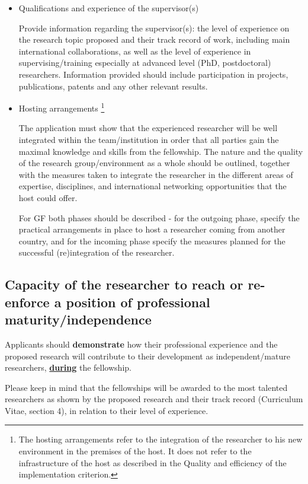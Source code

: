 \begin{itemize}
  \item Qualifications and experience of the supervisor(s)

Provide information regarding the supervisor(s): 
the level of experience on the research topic proposed and their track record of work, 
including main international collaborations, 
as well as the level of experience in supervising/training especially at advanced level (PhD, postdoctoral) researchers.
Information provided should include participation in projects, publications, patents and any other relevant results.

  \item Hosting arrangements%
\footnote{The hosting arrangements refer to the integration of the researcher to his new environment in the premises of the host. 
It does not refer to the infrastructure of the host as described in the Quality and efficiency of the implementation criterion.}

The application must show that the experienced researcher will be well integrated within the team/institution in order that all parties gain the maximal knowledge and skills from the fellowship.
The nature and the quality of the research group/environment as a whole should be outlined, 
together with the measures taken to integrate the researcher in the different areas of expertise, disciplines, and international networking opportunities that the host could offer.

For GF both phases should be described - for the outgoing phase, specify the practical arrangements in place to host a researcher coming from another country, 
and for the incoming phase specify the measures planned for the successful (re)integration of the researcher.
\end{itemize}




\subsection{Capacity of the researcher to reach or re-enforce a position of professional maturity/independence}
\label{sec:excellence_maturity}

Applicants should \textbf{demonstrate} how their professional experience and the proposed
research will contribute to their development as independent/mature researchers, \ul{\textbf{during}}
the fellowship.

\medskip\noindent
Please keep in mind that the fellowships will be awarded to the most talented researchers
as shown by the proposed research and their track record (Curriculum Vitae, section 4),
in relation to their level of experience.

